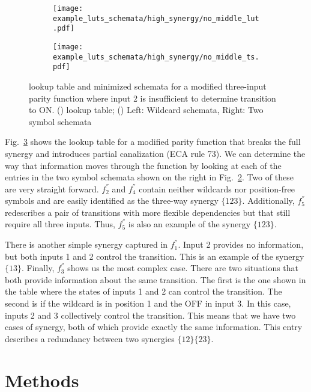 \documentclass[12pt]{article} %
\newcommand{\figref}[1]{Fig.~\ref{fig:#1}}
\begin{document}
\begin{figure}[h]
    \centering
    \begin{subfigure}{0.48\textwidth}
        \centering
        \texttt{[image: example\_luts\_schemata/high\_synergy/no\_middle\_lut.pdf]}
        \label{fig:lutk3}
        \caption{\label{fig:lutk3}}
    \end{subfigure}
    \begin{subfigure}{0.48\textwidth}
        \centering
        \texttt{[image: example\_luts\_schemata/high\_synergy/no\_middle\_ts.pdf]}
        \label{fig:tsk3}
        \caption{\label{fig:tsk3}}
    \end{subfigure}
    \caption{lookup table and minimized schemata for a modified three-input 
    parity function where input 2 is insufficient to determine transition to 
    ON.
    () lookup table;
    () Left: Wildcard schemata, Right: Two symbol schemata}
    \label{fig:rulek3}
\end{figure}

\figref{rulek3} shows the lookup table for a modified parity function that 
breaks the full synergy and introduces partial canalization (ECA rule 73). We 
can determine the way that information moves through the function by looking 
at each of the entries in the two symbol schemata shown on the right in 
\figref{tsk3}. Two of these are very straight forward. $f^{''}_2$ and 
$f^{''}_4$ contain neither wildcards nor position-free symbols and are easily 
identified as the three-way synergy $\{123\}$. Additionally, $f^{''}_5$ 
redescribes a pair of transitions with more flexible dependencies but that 
still require all three inputs. Thus, $f^{''}_5$ is also an example of the 
synergy $\{123\}$.

There is another simple synergy captured in $f^{''}_1$. Input 2 provides no 
information, but both inputs 1 and 2 control the transition. This is an 
example of the synergy $\{13\}$. Finally, $f^{''}_3$ shows us the most complex 
case. There are two situations that both provide information about the same 
transition. The first is the one shown in the table where the states of inputs 
1 and 2 can control the transition. The second is if the wildcard is in 
position 1 and the OFF in input 3. In this case, inputs 2 and 3 collectively 
control the transition. This means that we have two cases of synergy, both of 
which provide exactly the same information. This entry describes a redundancy 
between two synergies $\{12\}\{23\}$.

\section{Methods}\label{sec:methods} %


\printbibliography
    
\end{document}
